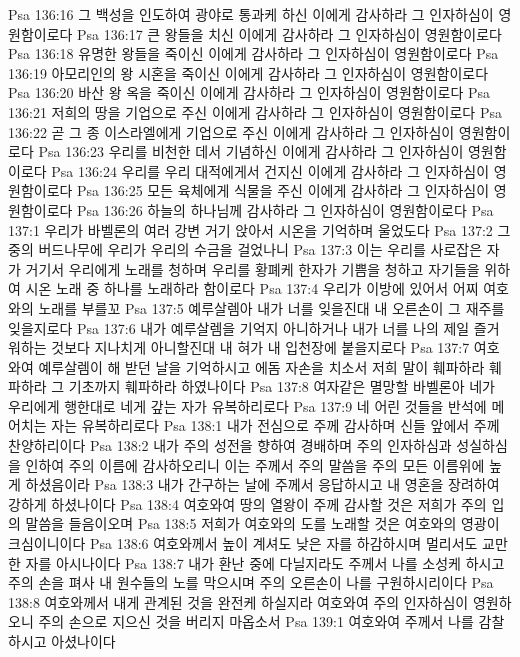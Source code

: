 Psa 136:16  그 백성을 인도하여 광야로 통과케 하신 이에게 감사하라 그 인자하심이 영원함이로다
Psa 136:17  큰 왕들을 치신 이에게 감사하라 그 인자하심이 영원함이로다
Psa 136:18  유명한 왕들을 죽이신 이에게 감사하라 그 인자하심이 영원함이로다
Psa 136:19  아모리인의 왕 시혼을 죽이신 이에게 감사하라 그 인자하심이 영원함이로다
Psa 136:20  바산 왕 옥을 죽이신 이에게 감사하라 그 인자하심이 영원함이로다
Psa 136:21  저희의 땅을 기업으로 주신 이에게 감사하라 그 인자하심이 영원함이로다
Psa 136:22  곧 그 종 이스라엘에게 기업으로 주신 이에게 감사하라 그 인자하심이 영원함이로다
Psa 136:23  우리를 비천한 데서 기념하신 이에게 감사하라 그 인자하심이 영원함이로다
Psa 136:24  우리를 우리 대적에게서 건지신 이에게 감사하라 그 인자하심이 영원함이로다
Psa 136:25  모든 육체에게 식물을 주신 이에게 감사하라 그 인자하심이 영원함이로다
Psa 136:26  하늘의 하나님께 감사하라 그 인자하심이 영원함이로다
Psa 137:1  우리가 바벨론의 여러 강변 거기 앉아서 시온을 기억하며 울었도다
Psa 137:2  그 중의 버드나무에 우리가 우리의 수금을 걸었나니
Psa 137:3  이는 우리를 사로잡은 자가 거기서 우리에게 노래를 청하며 우리를 황폐케 한자가 기쁨을 청하고 자기들을 위하여 시온 노래 중 하나를 노래하라 함이로다
Psa 137:4  우리가 이방에 있어서 어찌 여호와의 노래를 부를꼬
Psa 137:5  예루살렘아 내가 너를 잊을진대 내 오른손이 그 재주를 잊을지로다
Psa 137:6  내가 예루살렘을 기억지 아니하거나 내가 너를 나의 제일 즐거워하는 것보다 지나치게 아니할진대 내 혀가 내 입천장에 붙을지로다
Psa 137:7  여호와여 예루살렘이 해 받던 날을 기억하시고 에돔 자손을 치소서 저희 말이 훼파하라 훼파하라 그 기초까지 훼파하라 하였나이다
Psa 137:8  여자같은 멸망할 바벨론아 네가 우리에게 행한대로 네게 갚는 자가 유복하리로다
Psa 137:9  네 어린 것들을 반석에 메어치는 자는 유복하리로다
Psa 138:1  내가 전심으로 주께 감사하며 신들 앞에서 주께 찬양하리이다
Psa 138:2  내가 주의 성전을 향하여 경배하며 주의 인자하심과 성실하심을 인하여 주의 이름에 감사하오리니 이는 주께서 주의 말씀을 주의 모든 이름위에 높게 하셨음이라
Psa 138:3  내가 간구하는 날에 주께서 응답하시고 내 영혼을 장려하여 강하게 하셨나이다
Psa 138:4  여호와여 땅의 열왕이 주께 감사할 것은 저희가 주의 입의 말씀을 들음이오며
Psa 138:5  저희가 여호와의 도를 노래할 것은 여호와의 영광이 크심이니이다
Psa 138:6  여호와께서 높이 계셔도 낮은 자를 하감하시며 멀리서도 교만한 자를 아시나이다
Psa 138:7  내가 환난 중에 다닐지라도 주께서 나를 소성케 하시고 주의 손을 펴사 내 원수들의 노를 막으시며 주의 오른손이 나를 구원하시리이다
Psa 138:8  여호와께서 내게 관계된 것을 완전케 하실지라 여호와여 주의 인자하심이 영원하오니 주의 손으로 지으신 것을 버리지 마옵소서
Psa 139:1  여호와여 주께서 나를 감찰하시고 아셨나이다
